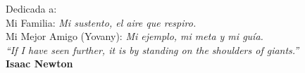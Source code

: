 \begin{titlepage}
 \vspace*{\fill}
 \begin{center}
{\Large Dedicada a:}\\
{\Large {\sc Mi Familia}}: \textit{\footnotesize Mi sustento, el aire que respiro.}\\
{\Large {\sc Mi Mejor Amigo}} (Yovany): \textit{\footnotesize Mi ejemplo, mi meta y mi guía.} 
\\[1.5cm]
\textit{``If I have seen further, it is by standing on the shoulders of giants.''}\\
\hspace{8.7cm}\textbf{Isaac Newton}\\
 \end{center}
 \vspace*{\fill}
\end{titlepage}
